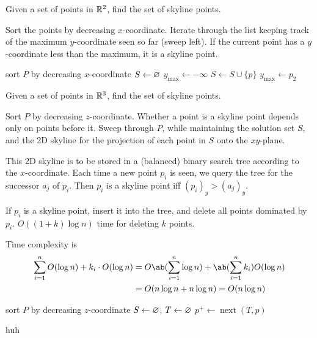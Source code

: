 \begin{question*}
    Given a set of points in $\mathbb{R}^2$, find the set of skyline points.
\end{question*}
\begin{solution}
    Sort the points by decreasing $x$-coordinate.
    Iterate through the list keeping track of the maximum $y$-coordinate
    seen so far (sweep left).
    If the current point has a $y$-coordinate less than the maximum,
    it is a skyline point.
    \begin{algo}
            \State sort $P$ by decreasing $x$-coordinate
            \State $S \gets \varnothing$
            \State $y_{\max} \gets -\infty$
                    \State $S \gets S \cup \{p\}$
                    \State $y_{\max} \gets p_2$
                \EndIf
            \EndFor
        \EndFn
    \end{algo} \vspace{-1.3em}
\end{solution}

\begin{question*}
    Given a set of points in $\mathbb{R}^3$, find the set of skyline points.
\end{question*}
\begin{solution}
    Sort $P$ by decreasing $z$-coordinate.
    Whether a point is a skyline point depends only on points before it.
    Sweep through $P$, while maintaining the solution set $S$, and the
    2D skyline for the projection of each point in $S$ onto the $xy$-plane.

    This 2D skyline is to be stored in a (balanced) binary search tree
    according to the $x$-coordinate.
    Each time a new point $p_i$ is seen, we query the tree for the successor
    $a_j$ of $p_i$.
    Then $p_i$ is a skyline point iff $(p_i)_y > (a_j)_y$.

    If $p_i$ is a skyline point, insert it into the tree, and delete all
    points dominated by $p_i$.
    $O((1 + k) \log n)$ time for deleting $k$ points.

    Time complexity is \begin{align*}
        \sum_{i=1}^n O(\log n) + k_i \cdot O(\log n)
            &= O\ab(\sum_{i=1}^n \log n) + \ab(\sum_{i=1}^n k_i) O(\log n)\\
            &= O(n \log n + n \log n) = O(n \log n)
    \end{align*}
    \begin{algo}
            \State sort $P$ by decreasing $z$-coordinate
            \State $S \gets \varnothing$, $T \gets \varnothing$
                \State $p^+ \gets \operatorname{next}(T, p)$
                \EndIf
            \EndFor
        \EndFn
    \end{algo}
    \begin{algo}
            \State huh
        \EndFn
    \end{algo}
\end{solution}
